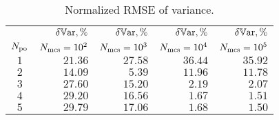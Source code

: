 \begin{table}
  \centering
  \caption{Normalized RMSE of variance.}
  \vspace{-10pt}
  \begin{tabular}{crrrr}
    \toprule
    {} & $\delta\mathbb{V}\text{ar}, \%$ & $\delta\mathbb{V}\text{ar}, \%$ & $\delta\mathbb{V}\text{ar}, \%$ & $\delta\mathbb{V}\text{ar}, \%$ \\
    ${N_\text{po}}$ & $N_\text{mcs} = 10^2$ & $N_\text{mcs} = 10^3$ & $N_\text{mcs} = 10^4$ & $N_\text{mcs} = 10^5$ \\
    \midrule
    $1 $ & $21.36$ & $27.58$ & $36.44$ & $35.92$ \\
    $2 $ & $14.09$ & $ 5.39$ & $11.96$ & $11.78$ \\
    $3 $ & $27.60$ & $15.20$ & $ 2.19$ & $ 2.07$ \\
    $4 $ & $29.20$ & $16.56$ & $ 1.67$ & $ 1.51$ \\
    $5 $ & $29.79$ & $17.06$ & $ 1.68$ & $ 1.50$ \\
    \bottomrule
  \end{tabular}
  \vspace{-10pt}
\end{table}
